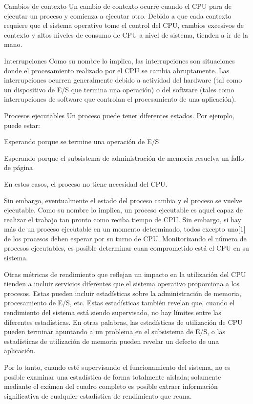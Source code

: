 \documentclass[12pt]{article}
\begin{document}
\begin{itemize}
Cambios de contexto
Un cambio de contexto ocurre cuando el CPU para de ejecutar un proceso y comienza a ejecutar otro. Debido a que cada contexto requiere que el sistema operativo tome el control del CPU, cambios excesivos de contexto y altos niveles de consumo de CPU a nivel de sistema, tienden a ir de la mano.

Interrupciones
Como su nombre lo implica, las interrupciones son situaciones donde el procesamiento realizado por el CPU se cambia abruptamente. Las interrupciones ocurren generalmente debido a actividad del hardware (tal como un dispositivo de E/S que termina una operación) o del software (tales como interrupciones de software que controlan el procesamiento de una aplicación).

Procesos ejecutables
Un proceso puede tener diferentes estados. Por ejemplo, puede estar:

Esperando porque se termine una operación de E/S

Esperando porque el subsistema de administración de memoria resuelva un fallo de página

En estos casos, el proceso no tiene necesidad del CPU.

Sin embargo, eventualmente el estado del proceso cambia y el proceso se vuelve ejecutable. Como su nombre lo implica, un proceso ejecutable es aquel capaz de realizar el trabajo tan pronto como reciba tiempo de CPU. Sin embargo, si hay más de un proceso ejecutable en un momento determinado, todos excepto uno[1] de los procesos deben esperar por su turno de CPU. Monitorizando el número de procesos ejecutables, es posible determinar cuan comprometido está el CPU en su sistema.

Otras métricas de rendimiento que reflejan un impacto en la utilización del CPU tienden a incluir servicios diferentes que el sistema operativo proporciona a los procesos. Estas pueden incluir estadísticas sobre la administración de memoria, procesamiento de E/S, etc. Estas estadísticas también revelan que, cuando el rendimiento del sistema está siendo supervisado, no hay límites entre las diferentes estadísticas. En otras palabras, las estadísticas de utilización de CPU pueden terminar apuntando a un problema en el subsistema de E/S, o las estadísticas de utilización de memoria pueden revelar un defecto de una aplicación.

Por lo tanto, cuando esté supervisando el funcionamiento del sistema, no es posible examinar una estadística de forma totalmente aislada; solamente mediante el exámen del cuadro completo es posible extraer información significativa de cualquier estadística de rendimiento que reuna.


\end{itemize}
\end{document}
